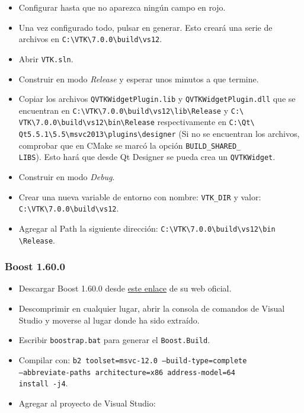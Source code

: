 \begin{itemize}
	\item Configurar hasta que no aparezca ningún campo en rojo.
	\item Una vez configurado todo, pulsar en generar. Esto creará una serie de archivos en \texttt{C:\textbackslash VTK\textbackslash 7.0.0\textbackslash build\textbackslash vs12}.
	\item Abrir \texttt{VTK.sln}.
	\item Construir en modo \textit{Release} y esperar unos minutos a que termine.
	\item Copiar los archivos \texttt{QVTKWidgetPlugin.lib} y \texttt{QVTKWidgetPlugin.dll} que se encuentran en \texttt{C:\textbackslash VTK\textbackslash 7.0.0\textbackslash build\textbackslash vs12\textbackslash lib\textbackslash Release} y \texttt{C:\textbackslash\\  VTK\textbackslash 7.0.0\textbackslash build\textbackslash vs12\textbackslash bin\textbackslash Release} respectivamente en \texttt{C:\textbackslash Qt\textbackslash\\ Qt5.5.1\textbackslash 5.5\textbackslash msvc2013\textbackslash plugins\textbackslash designer} (Si no se encuentran los archivos, comprobar que en CMake se marcó la opción \texttt{BUILD\_SHARED\_\\ LIBS}). Esto hará que desde Qt Designer se pueda crea un \texttt{QVTKWidget}.
	\item Construir en modo \textit{Debug}.
	\item Crear una nueva variable de entorno con nombre: \texttt{VTK\_DIR} y valor: \texttt{C:\textbackslash VTK\textbackslash 7.0.0\textbackslash build\textbackslash vs12}.
	\item Agregar al Path la siguiente dirección: \texttt{C:\textbackslash VTK\textbackslash 7.0.0\textbackslash build\textbackslash vs12\textbackslash bin\\ \textbackslash Release}.
\end{itemize}

\subsubsection{Boost 1.60.0}

\begin{itemize}
	\item Descargar Boost 1.60.0 desde \href{http://sourceforge.net/projects/boost/files/boost/1.60.0/}{este enlace} de su web oficial.
	\item Descomprimir en cualquier lugar, abrir la consola de comandos de Visual Studio y moverse al lugar donde ha sido extraído.
	\item Escribir \texttt{boostrap.bat} para generar el \texttt{Boost.Build}.
	\item Compilar con: \texttt{b2 toolset=msvc-12.0 --build-type=complete \\ --abbreviate-paths architecture=x86 address-model=64 \\ install -j4}.
	\item Agregar al proyecto de Visual Studio: 
\end{itemize}

